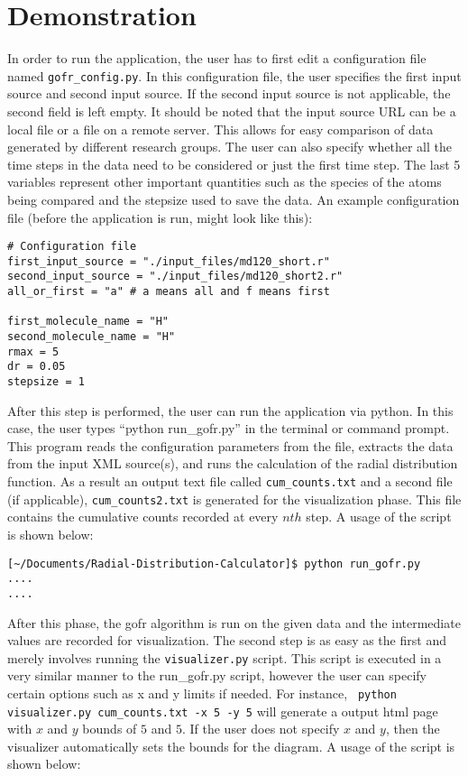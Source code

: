 \section*{Demonstration}

In order to run the application, the user has to first edit a configuration file named \verb|gofr_config.py|. In this configuration file, the user specifies the first input source and second input source. If the second input source is not applicable, the second field is left empty. It should be noted that the input source URL can be a local file or a file on a remote server. This allows for easy comparison of data generated by different research groups. The user can also specify whether all the time steps in the data need to be considered or just the first time step. The last 5 variables represent other important quantities such as the species of the atoms being compared and the stepsize used to save the data. An example configuration file (before the application is run, might look like this):

\singlespacing
\begin{verbatim}
# Configuration file
first_input_source = "./input_files/md120_short.r"
second_input_source = "./input_files/md120_short2.r"
all_or_first = "a" # a means all and f means first

first_molecule_name = "H"
second_molecule_name = "H"
rmax = 5
dr = 0.05
stepsize = 1
\end{verbatim}
\doublespacing


After this step is performed, the user can run the application via python. In this case, the user types ``python run\_gofr.py'' in the terminal or command prompt. This program reads the configuration parameters from the file, extracts the data from the input XML source(s), and runs the calculation of the radial distribution function. As a result an output text file called \verb|cum_counts.txt| and a second file (if applicable), \verb|cum_counts2.txt| is generated for the visualization phase. This file contains the cumulative counts recorded at every $nth$ step. A usage of the script is shown below:


\begin{verbatim}
[~/Documents/Radial-Distribution-Calculator]$ python run_gofr.py
....
....
\end{verbatim}

After this phase, the gofr algorithm is run on the given data and the intermediate values are recorded for visualization. The second step is as easy as the first and merely involves running the \verb|visualizer.py| script. This script is executed in a very similar manner to the run\_gofr.py script, however the user can specify certain options such as x and y limits if needed. For instance, \verb| python visualizer.py cum_counts.txt -x 5 -y 5| will generate a output html page with $x$ and $y$ bounds of $5$ and $5$. If the user does not specify $x$ and $y$, then the visualizer automatically sets the bounds for the diagram. A usage of the script is shown below:

